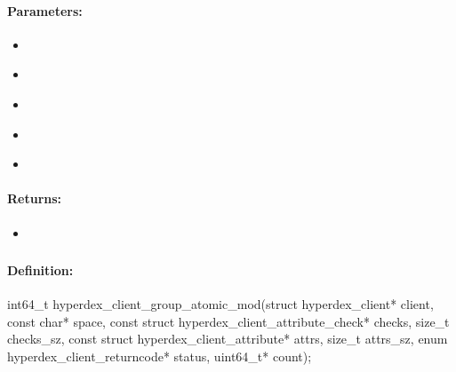 \paragraph{Parameters:}
\begin{itemize}[noitemsep]
\item {}\\

\item {}\\

\item {}\\

\item {}\\

\item {}\\

\end{itemize}

\paragraph{Returns:}
\begin{itemize}[noitemsep]
\item {}\\

\end{itemize}

\pagebreak
\subsubsection{}
\label{api:c:group_atomic_mod}


\paragraph{Definition:}
\begin{ccode}
int64_t hyperdex_client_group_atomic_mod(struct hyperdex_client* client,
        const char* space,
        const struct hyperdex_client_attribute_check* checks, size_t checks_sz,
        const struct hyperdex_client_attribute* attrs, size_t attrs_sz,
        enum hyperdex_client_returncode* status,
        uint64_t* count);
\end{ccode}

